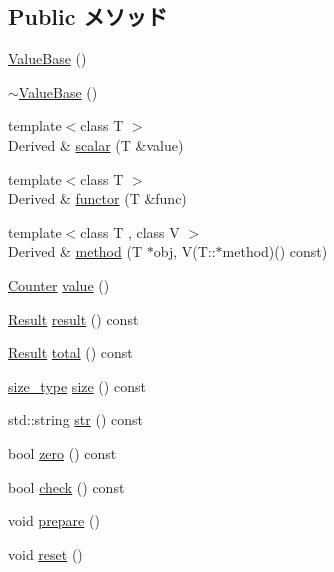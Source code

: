 \subsection*{Public メソッド}
\begin{DoxyCompactItemize}
\item 
\hyperlink{classStats_1_1ValueBase_a38d678a727aba419ecd2d61f5c09f888}{ValueBase} ()
\item 
\hyperlink{classStats_1_1ValueBase_ab56bf71328d47bae61dcfa424b8ca3b7}{$\sim$ValueBase} ()
\item 
{\footnotesize template$<$class T $>$ }\\Derived \& \hyperlink{classStats_1_1ValueBase_a0273fd64504789a214a7057649605612}{scalar} (T \&value)
\item 
{\footnotesize template$<$class T $>$ }\\Derived \& \hyperlink{classStats_1_1ValueBase_aa3df13f1c3d0b3365307d29d98c4eca0}{functor} (T \&func)
\item 
{\footnotesize template$<$class T , class V $>$ }\\Derived \& \hyperlink{classStats_1_1ValueBase_a3ea8dbc213c141b2533317c6e4f1c00e}{method} (T $\ast$obj, V(T::$\ast$method)() const)
\item 
\hyperlink{namespaceStats_ac35128c026c72bb36af9cea00774e8a6}{Counter} \hyperlink{classStats_1_1ValueBase_aced120d8613c6808b53daaa566cbaa27}{value} ()
\item 
\hyperlink{namespaceStats_ad874d2cfd4b4a29ebd480bb2e67f20ae}{Result} \hyperlink{classStats_1_1ValueBase_ae050da86c3d8e8a677a0bdeb7971e1e3}{result} () const 
\item 
\hyperlink{namespaceStats_ad874d2cfd4b4a29ebd480bb2e67f20ae}{Result} \hyperlink{classStats_1_1ValueBase_a35c6e2ed3fc81b40d69052a062113ead}{total} () const 
\item 
\hyperlink{namespaceStats_ada51e68d31936547d3729c82daf6b7c6}{size\_\-type} \hyperlink{classStats_1_1ValueBase_a503ab01f6c0142145d3434f6924714e7}{size} () const 
\item 
std::string \hyperlink{classStats_1_1ValueBase_a1b9b8885b0880fc4ddf9a2c7d1ca3dc4}{str} () const 
\item 
bool \hyperlink{classStats_1_1ValueBase_a4e72b01b727d3165e75cba84eb507491}{zero} () const 
\item 
bool \hyperlink{classStats_1_1ValueBase_a6ecddb2c44556b7acbc1723a968ff8bb}{check} () const 
\item 
void \hyperlink{classStats_1_1ValueBase_a1825b40ca3bc3a1ba67fdb58fac5015c}{prepare} ()
\item 
void \hyperlink{classStats_1_1ValueBase_ad20897c5c8bd47f5d4005989bead0e55}{reset} ()
\end{DoxyCompactItemize}
